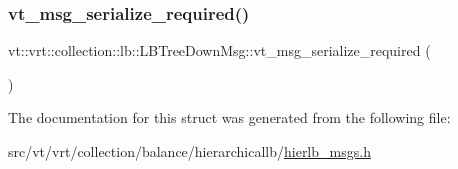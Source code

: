 \subsubsection{\texorpdfstring{vt\+\_\+msg\+\_\+serialize\+\_\+required()}{vt\_msg\_serialize\_required()}}
{\footnotesize\ttfamily vt\+::vrt\+::collection\+::lb\+::\+L\+B\+Tree\+Down\+Msg\+::vt\+\_\+msg\+\_\+serialize\+\_\+required (\begin{DoxyParamCaption}{ }\end{DoxyParamCaption})}



The documentation for this struct was generated from the following file\+:\begin{DoxyCompactItemize}
\item 
src/vt/vrt/collection/balance/hierarchicallb/\hyperlink{hierlb__msgs_8h}{hierlb\+\_\+msgs.\+h}\end{DoxyCompactItemize}
